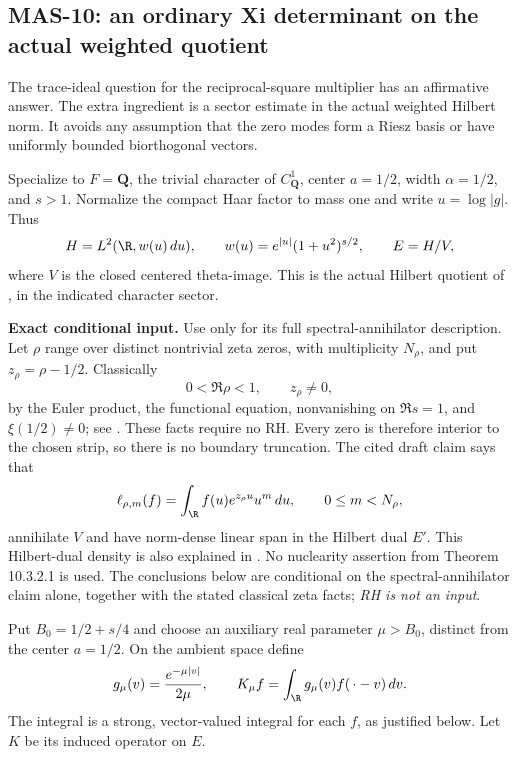 \subsection{MAS-10: an ordinary Xi determinant on the actual weighted quotient}
The trace-ideal question for the reciprocal-square multiplier has an affirmative answer. The extra ingredient is a sector estimate in the actual weighted Hilbert norm. It avoids any assumption that the zero modes form a Riesz basis or have uniformly bounded biorthogonal vectors.

Specialize to $F=\mathbf Q$, the trivial character of $C_{\mathbf Q}^1$, center $a=1/2$, width $\alpha=1/2$, and $s>1$. Normalize the compact Haar factor to mass one and write $u=\log|g|$. Thus
\[
 H=L^2(\R,w(u)\,du),\qquad
 w(u)=e^{|u|}(1+u^2)^{s/2},\qquad E=H/V,
\]
where $V$ is the closed centered theta-image. This is the actual Hilbert quotient of \cite[(10.2.2.1)--(10.2.2.2), p.~445]{masullo}, in the indicated character sector.

\textbf{Exact conditional input.} Use \cite[Theorem 10.2.2.1, (10.2.2.4)--(10.2.2.6), p.~446]{masullo} only for its full spectral-annihilator description. Let $\rho$ range over distinct nontrivial zeta zeros, with multiplicity $N_\rho$, and put $z_\rho=\rho-1/2$. Classically
\[
 0<\Re\rho<1,\qquad z_\rho\ne0,
\]
by the Euler product, the functional equation, nonvanishing on $\Re s=1$, and $\xi(1/2)\ne0$; see \cite[\S2.12; \S3.2, pp.~46--47]{titch}. These facts require no RH. Every zero is therefore interior to the chosen strip, so there is no boundary truncation. The cited draft claim says that
\[
 \ell_{\rho,m}(f)=\int_{\R}f(u)e^{z_\rho u}u^m\,du,
 \qquad 0\le m<N_\rho,
\]
annihilate $V$ and have norm-dense linear span in the Hilbert dual $E'$. This Hilbert-dual density is also explained in \cite[Remark 10.2.1.2, pp.~440--441]{masullo}. No nuclearity assertion from Theorem 10.3.2.1 is used. The conclusions below are conditional on the spectral-annihilator claim alone, together with the stated classical zeta facts; \emph{RH is not an input}.

Put $B_0=1/2+s/4$ and choose an auxiliary real parameter $\mu>B_0$, distinct from the center $a=1/2$. On the ambient space define
\[
 g_\mu(v)=\frac{e^{-\mu|v|}}{2\mu},\qquad
 K_\mu f=\int_{\R}g_\mu(v)f(\,\cdot-v)\,dv.
\]
The integral is a strong, vector-valued integral for each $f$, as justified below. Let $K$ be its induced operator on $E$.


